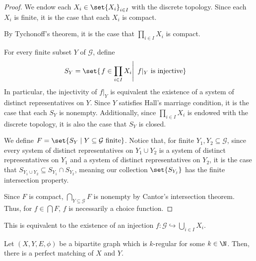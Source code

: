 \documentclass[10pt]{mypackage}
\begin{document}
  \begin{proof}
    We endow each $X_i\in \set{X_i}_{i\in I}$ with the discrete topology. Since each $X_i$ is finite, it is the case that each $X_i$ is compact.\newline

    By Tychonoff's theorem, it is the case that $\prod_{i\in I}X_i$ is compact.\newline

    For every finite subset $Y$ of $\mathcal{G}$, define
    \begin{align*}
      S_Y &= \set{\left. f\in \prod_{i\in I}X_i \right|~f\vert_{Y}\text{ is injective}}
    \end{align*}
    In particular, the injectivity of $f\vert_{Y}$ is equivalent the existence of a system of distinct representatives on $Y$. Since $Y$ satisfies Hall's marriage condition, it is the case that each $S_Y$ is nonempty. Additionally, since $\prod_{i\in I}X_i$ is endowed with the discrete topology, it is also the case that $S_Y$ is closed.\newline

    We define $F = \set{S_Y\mid Y\subseteq \mathcal{G}\text{ finite}}$. Notice that, for finite $Y_1,Y_2\subseteq \mathcal{G}$, since every system of distinct representatives on $Y_1\cup Y_2$ is a system of distinct representatives on $Y_1$ and a system of distinct representatives on $Y_2$, it is the case that $S_{Y_1\cup Y_2}\subseteq S_{Y_1}\cap S_{Y_2}$, meaning our collection $\set{S_{Y_j}}$ has the finite intersection property. \newline

    Since $F$ is compact, $\bigcap_{Y\subseteq \mathcal{G}} F$ is nonempty by Cantor's intersection theorem. Thus, for $f\in \bigcap F$, $f$ is necessarily a choice function. 
  \end{proof}
  \begin{remark}
    This is equivalent to the existence of an injection $f: \mathcal{G}\hookrightarrow \bigcup_{i\in I}X_i$.
  \end{remark}
  \begin{theorem}
    Let $(X,Y,E,\phi)$ be a bipartite graph which is $k$-regular for some $k\in\N$. Then, there is a perfect matching of $X$ and $Y$.
  \end{theorem}
\end{document}
